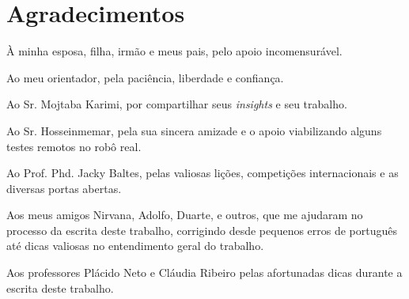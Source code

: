 
\chapter*{Agradecimentos}

À minha esposa, filha, irmão e meus pais, pelo apoio incomensurável.

Ao meu orientador, pela paciência, liberdade e confiança.

Ao Sr. Mojtaba Karimi, por compartilhar seus \textit{insights} e seu trabalho.

Ao Sr. Hosseinmemar, pela sua sincera amizade e o apoio viabilizando alguns testes remotos no robô real.

Ao Prof. Phd. Jacky Baltes, pelas valiosas lições, competições internacionais e as diversas portas abertas.

Aos meus amigos Nirvana, Adolfo, Duarte, e outros, que me ajudaram no processo da escrita deste trabalho, corrigindo desde pequenos erros de português até dicas valiosas no entendimento geral do trabalho.

Aos professores Plácido Neto e Cláudia Ribeiro pelas afortunadas dicas durante a escrita deste trabalho.